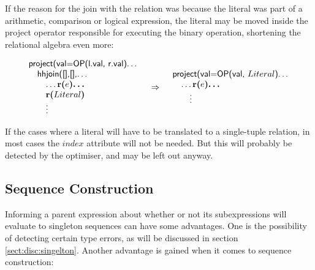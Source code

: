 If the reason for the join with the relation was because the literal was part of
a arithmetic, comparison or logical expression, the literal may be moved inside the \textsf{project} operator responsible for executing the
binary operation, shortening the relational algebra even more:

\begin{equation}
\begin{array}{lcr}
\begin{array}{l}
\mbox{\textsf{project(val=OP(l.val, r.val)\ldots}} \\ \quad
\mbox{\textsf{hhjoin([],[],\ldots}} \\ \quad \quad
\mbox{\textsf{\ldots}\textbf{r(}}e\mbox{\textbf{)\ldots}} \\ \quad \quad
\mbox{\textbf{r(}}Literal\mbox{\textbf{)}} \\
\mbox{\quad\quad\textsf{\vdots}}
\end{array}
&
\Rightarrow
&
\begin{array}{l}
\mbox{\textsf{project(val=OP(val, }}Literal\mbox{\textsf{)\ldots}} \\ \quad
\mbox{\textsf{\ldots}\textbf{r(}}e\mbox{\textbf{)\ldots}} \\
\mbox{\quad\quad\textsf{\vdots}}
\end{array}
\end{array}
\label{simpl:trans:TD:binLit}
\end{equation}

If the cases where a literal will have to be translated to a single-tuple relation, in most cases the $index$
attribute will not be needed. But this will probably be detected by the
optimiser, and may be left out anyway.

\subsection{Sequence Construction}
\label{sect:trans:TD:simpl:seq}

Informing a parent expression about whether or not its subexpressions will
evaluate to singleton sequences can have some advantages. One is the possibility of detecting certain type errors, as will be
discussed in section \ref{sect:disc:singelton}. Another advantage is gained
when it comes to sequence construction:

